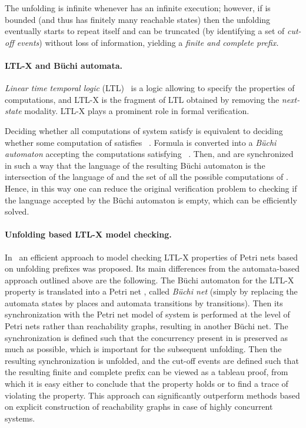 \documentclass[a4paper]{article}
\newcommand{\buchi}                {\mbox{B\"uchi}\xspace}
\begin{document}
The unfolding is infinite whenever  has an infinite execution; however, if  is bounded (and thus has finitely many reachable states) then the unfolding eventually starts to repeat itself and can be truncated (by identifying a set of \emph{cut-off events}) without loss of information, yielding a \emph{finite and complete prefix.} 

\paragraph{LTL-X and \buchi automata.}

\emph{Linear time temporal logic} (LTL)~\cite{P-77} is a logic allowing to specify the properties of computations, and LTL-X is the fragment of LTL obtained by removing the \emph{next-state} modality. LTL-X plays a prominent role in formal verification.

Deciding whether all computations of system  satisfy  is equivalent to deciding whether some computation of  satisfies ~\cite{VW-86}. Formula  is converted into a \emph{\buchi automaton}  accepting the computations satisfying ~\cite{GO-01}. Then,  and  are synchronized in such a way that the language of the resulting \buchi automaton  is the intersection of the language of  and the set of all the possible computations of . Hence, in this way one can reduce the original verification problem to checking if the language accepted by the \buchi automaton  is empty, which can be efficiently solved.

\paragraph{Unfolding based LTL-X model checking.}

In~\cite{EH-01} an efficient approach to model checking LTL-X properties of Petri nets based on unfolding prefixes was proposed. Its main differences from the automata-based approach outlined above are the following. The \buchi automaton  for the LTL-X property  is translated into a Petri net , called \emph{\buchi net} (simply by replacing the automata states by places and automata transitions by transitions). Then its synchronization with the Petri net model of system  is performed at the level of Petri nets rather than reachability graphs, resulting in another \buchi net. The synchronization is defined such that the concurrency present in  is preserved as much as possible, which is important for the subsequent unfolding. Then the resulting synchronization is unfolded, and
the cut-off events are defined such that the resulting finite and complete prefix can be viewed as a tableau proof, from which it is easy either to conclude that the property holds or to find a trace of  violating the property. This approach can significantly outperform methods based on explicit construction of reachability graphs in case of highly concurrent systems.
\end{document}
